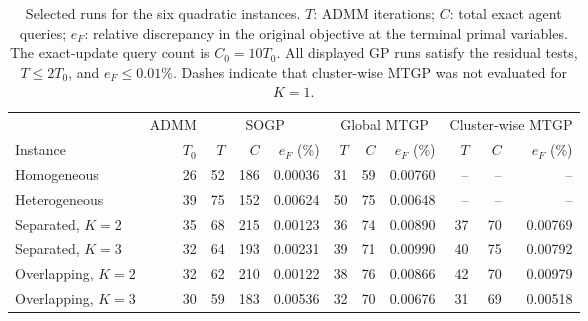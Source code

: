 \begin{table}[t]
\centering
\caption{Selected runs for the six quadratic instances. $T$: ADMM iterations; $C$: total exact agent queries; $e_F$: relative discrepancy in the original objective at the terminal primal variables. The exact-update query count is $C_0=10T_0$. All displayed GP runs satisfy the residual tests, $T\leq2T_0$, and $e_F\leq0.01\%$. Dashes indicate that cluster-wise MTGP was not evaluated for $K=1$.}
\label{tab:main_results}
\footnotesize
\setlength{\tabcolsep}{5.1pt}
\renewcommand{\arraystretch}{1.12}
\begin{tabular}{l r rrr rrr rrr}
\toprule
& ADMM & \multicolumn{3}{c}{SOGP} & \multicolumn{3}{c}{Global MTGP} & \multicolumn{3}{c}{Cluster-wise MTGP}\\
\cmidrule(lr){2-2}\cmidrule(lr){3-5}\cmidrule(lr){6-8}\cmidrule(lr){9-11}
Instance & $T_0$ & $T$ & $C$ & $e_F$ (\%) & $T$ & $C$ & $e_F$ (\%) & $T$ & $C$ & $e_F$ (\%)\\
\midrule
Homogeneous & 26 & 52 & 186 & 0.00036 & 31 & 59 & 0.00760 & -- & -- & -- \\
Heterogeneous & 39 & 75 & 152 & 0.00624 & 50 & 75 & 0.00648 & -- & -- & -- \\
Separated, $K=2$ & 35 & 68 & 215 & 0.00123 & 36 & 74 & 0.00890 & 37 & 70 & 0.00769 \\
Separated, $K=3$ & 32 & 64 & 193 & 0.00231 & 39 & 71 & 0.00990 & 40 & 75 & 0.00792 \\
Overlapping, $K=2$ & 32 & 62 & 210 & 0.00122 & 38 & 76 & 0.00866 & 42 & 70 & 0.00979 \\
Overlapping, $K=3$ & 30 & 59 & 183 & 0.00536 & 32 & 70 & 0.00676 & 31 & 69 & 0.00518 \\
\bottomrule
\end{tabular}
\end{table}
